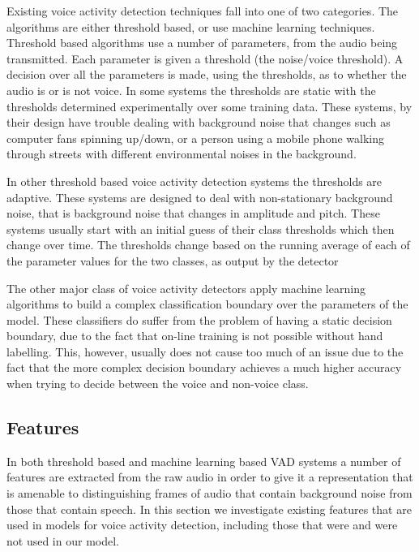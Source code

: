 \documentclass[ %
                    author={Sam Phippen},
                supervisor={Dr. Rafal Bogacz},
                     title={Real time voice activity detectors in noisy personal computing environments},
                  subtitle={},
                    degree={MEng},
                      year={2012} ]{thesis}
\begin{document}
Existing voice activity detection techniques fall into one of two categories.
The algorithms are either threshold based, or use machine learning techniques.
Threshold based algorithms use a number of parameters, from the audio being
transmitted. Each parameter is given a threshold (the noise/voice threshold). A
decision over all the parameters is made, using the thresholds, as to whether
the audio is or is not voice. In some systems the thresholds are static with
the thresholds determined experimentally over some training data\cite{haigh}.
These systems, by their design have trouble dealing with background noise that
changes such as computer fans spinning up/down, or a person using a mobile
phone walking through streets with different environmental noises in the
background.

In other threshold based voice activity detection systems the thresholds are
adaptive\cite{gokhun}. These systems are designed to deal with non-stationary
background noise, that is background noise that changes in amplitude and pitch.
These systems usually start with an initial guess of their class thresholds
which then change over time. The thresholds change based on the running average
of each of the parameter values for the two classes, as output by the
detector\cite{sakhnov}

The other major class of voice activity detectors apply machine learning
algorithms to build a complex classification boundary over the parameters of
the model\cite{shin}. These classifiers do suffer from the problem of having a static
decision boundary, due to the fact that on-line training is not possible
without hand labelling. This, however, usually does not cause too much of an
issue due to the fact that the more complex decision boundary achieves a much
higher accuracy when trying to decide between the voice and non-voice class.

\subsection {Features}

In both threshold based and machine learning based VAD systems a number of
features are extracted from the raw audio in order to give it a representation
that is amenable to distinguishing frames of audio that contain background
noise from those that contain speech. In this section we investigate existing
features that are used in models for voice activity detection, including those
that were and were not used in our model.
\end{document}
